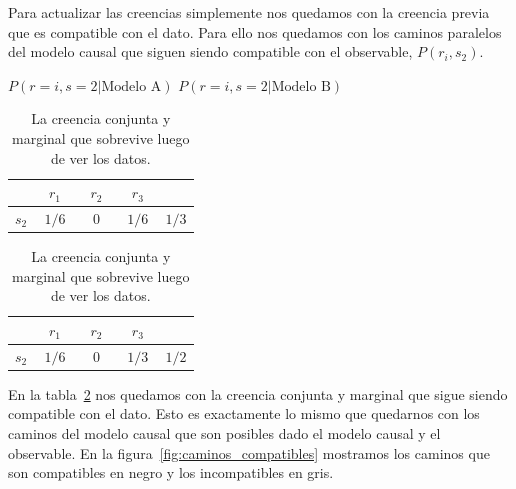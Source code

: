 \documentclass[a4paper,11pt]{book}
\theoremstyle{definition}
\begin{document}

Para actualizar las creencias simplemente nos quedamos con la creencia previa que es compatible con el dato.
%
Para ello nos quedamos con los caminos paralelos del modelo causal que siguen siendo compatible con el observable, $P(r_i, s_2)$.
%
\begin{table}[ht!]
\centering
$P(r=i, s=2 | \text{Modelo A})$ \hspace{2.7cm} $P(r=i, s=2 | \text{Modelo B})$ \\[0.1cm]
\begin{tabular}{|c|c|c|c||c|} \hline \setlength\tabcolsep{0.4cm}
       & \, $r_1$ \, &  \, $r_2$ \, & \, $r_3$ \, & \\ \hline
  $s_2$ & $1/6$ & $0$ & $1/6$ & $1/3$ \\ \hline
  \end{tabular}
  \hspace{1.5cm}
  \begin{tabular}{|c|c|c|c||c|} \hline  \setlength\tabcolsep{0.4cm}
 & \, $r_1$ \, &  \, $r_2$ \, & \, $r_3$ \, & \\ \hline
  $s_2$ & $1/6$ & $0$ & $1/3$ & $1/2$ \\ \hline
  \end{tabular}
  \caption{La creencia conjunta y marginal que sobrevive luego de ver los datos. }
  \label{tab:creencia_compatible}
\end{table}

En la tabla~\ref{tab:creencia_compatible} nos quedamos con la creencia conjunta y marginal que sigue siendo compatible con el dato.
%
Esto es exactamente lo mismo que quedarnos con los caminos del modelo causal que son posibles dado el modelo causal y el observable.
%
En la figura~\ref{fig:caminos_compatibles} mostramos los caminos que son compatibles en negro y los incompatibles en gris.
\end{document}
